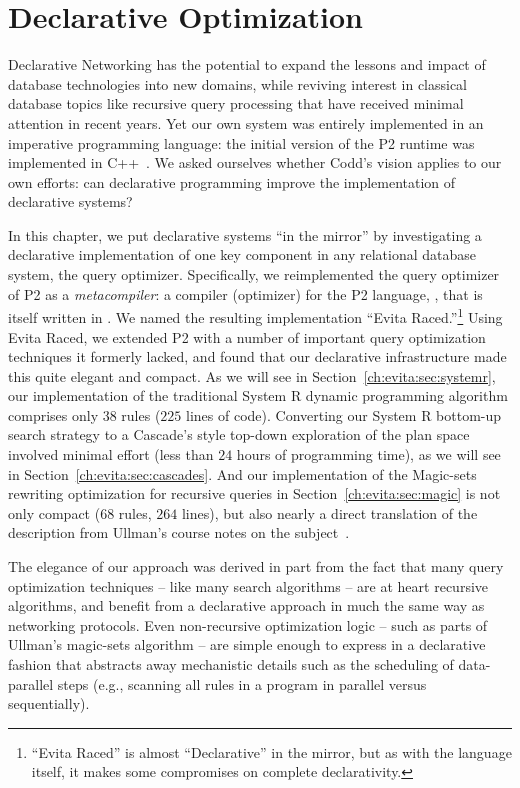 \chapter[Declarative Optimization]{Declarative Optimization}
\label{ch:evita}

Declarative Networking has the potential to expand the lessons and impact of
database technologies into new domains, while reviving interest in classical
database topics like recursive query processing that have received minimal
attention in recent years.  Yet our own system was entirely implemented in an
imperative programming language: the initial version of the P2 runtime was
implemented in C++~\cite{p2:sosp}.  We asked ourselves whether Codd's vision
applies to our own efforts: can declarative programming improve the
implementation of declarative systems?

In this chapter, we put declarative systems ``in the mirror'' by investigating
a declarative implementation of one key component in any relational database
system, the query optimizer.  Specifically, we reimplemented the query
optimizer of P2 as a {\em metacompiler}: a compiler (optimizer) for the P2
language, \OVERLOG, that is itself written in \OVERLOG.  We named the resulting
implementation ``Evita Raced.''\footnote{``Evita Raced'' is almost
``Declarative'' in the mirror, but as with the \OVERLOG language itself, it
makes some compromises on complete declarativity.} Using Evita Raced, we
extended P2 with a number of important query optimization techniques it
formerly lacked, and found that our declarative infrastructure made this quite
elegant and compact.  As we will see in Section~\ref{ch:evita:sec:systemr}, our
implementation of the traditional System R dynamic programming algorithm
comprises only $38$ \OVERLOG rules ($225$ lines of code).  Converting our
System R bottom-up search strategy to a Cascade's style top-down exploration of
the plan space involved minimal effort (less than $24$ hours of programming
time), as we will see in Section~\ref{ch:evita:sec:cascades}.  And our
implementation of the Magic-sets rewriting optimization for recursive queries
in Section~\ref{ch:evita:sec:magic} is not only compact ($68$ rules, $264$
lines), but also nearly a direct translation of the description from Ullman's
course notes on the subject~\cite{ullmanNotes}.

The elegance of our approach was derived in part from the fact that many query
optimization techniques -- like many search algorithms -- are at heart
recursive algorithms, and benefit from a declarative approach in much the same
way as networking protocols.  Even non-recursive optimization logic -- such as
parts of Ullman's magic-sets algorithm -- are simple enough to express in a
declarative fashion that abstracts away mechanistic details such as the
scheduling of data-parallel steps (e.g., scanning all rules in a program in
parallel versus sequentially).

